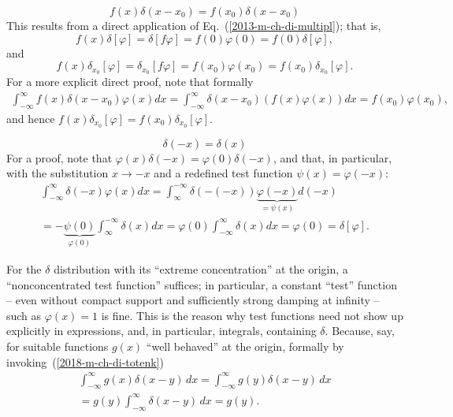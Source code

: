  \begin{equation}
 f (x)\delta (x-x_0)
 =
f (x_0)\delta (x-x_0)
\label{2018-m-ch-di-totenk}
 \end{equation}
{\color{OliveGreen}
\bproof
This results from a direct application of Eq.~(\ref{2013-m-ch-di-multipl}); that is,
 \begin{equation}
f(x) \delta
[\varphi ]
=
\delta
\left[  f  \varphi \right]
=
f(0)\varphi(0) = f(0)   \delta
[\varphi ]
,
 \end{equation}
and
 \begin{equation}
f(x) \delta_{x_0}
[\varphi ]
=
\delta_{x_0}
\left[  f  \varphi \right]
=
f({x_0})\varphi({x_0}) = f({x_0})   \delta_{x_0}
[\varphi ]
.
 \end{equation}
For a more explicit direct proof, note that formally
 \begin{equation}
 \begin{split}
\int _{-\infty}^\infty f (x)\delta (x-x_0)  \varphi(x) dx
=
\int _{-\infty}^\infty\delta (x-x_0)  ( f (x)\varphi(x) ) dx = f(x_0) \varphi(x_0)
,
 \end{split}
 \end{equation}
and hence $f(x) \delta_{x_0}[ \varphi ] =   f(x_0)\delta_{x_0}[ \varphi ]$.
\eproof
}


 \begin{equation}
 \delta (-x)=\delta (x)
 \end{equation}
{\color{OliveGreen}
\bproof
For a proof, note that $\varphi (x)\delta (-x) = \varphi (0)\delta (-x)$, and that, in particular,
with the substitution $x \rightarrow -x$ and a redefined test function $\psi (x) =\varphi(-x)$:
 \begin{equation}
 \begin{split}
\int _{-\infty}^\infty \delta (-x)  \varphi(x) dx   =
 \int_\infty ^{-\infty}\delta (-(-x)) \underbrace{\varphi(-x)}_{=\psi(x)} d(-x) \\
   =
-\underbrace{\psi(0)}_{\varphi(0)} \int _\infty ^{-\infty}\delta (x)  d x     =
\varphi(0) \int _{-\infty}^\infty \delta (x)  d x =\varphi(0)=\delta[\varphi].
 \end{split}
 \end{equation}
\eproof
}


For the $\delta$ distribution with its ``extreme concentration'' at the origin, a ``nonconcentrated test function'' suffices; in particular, a constant ``test'' function
-- even without compact support and sufficiently strong damping at infinity --
such as $\varphi (x) = 1$ is fine.
This is the reason why test functions need not show up explicitly in expressions, and, in particular, integrals, containing $\delta$.
Because, say, for suitable functions $g(x)$ ``well behaved'' at the origin, formally by invoking~(\ref{2018-m-ch-di-totenk})
 \begin{equation}
 \begin{split}
\int_{-\infty}^{\infty} g(x)\delta(x-y) \,dx =
\int_{-\infty}^{\infty} g(y)\delta(x-y) \,dx \\=
g(y)\int_{-\infty}^{\infty} \delta(x-y)  \,dx =g(y).
 \end{split}
\end{equation}

